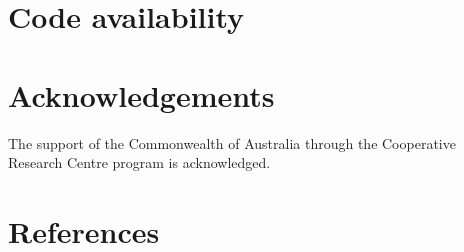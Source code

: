 \documentclass[final,3p,times,authoryear]{elsarticle}
\begin{document}
\printglossary[title={List of Symbols}]

\section{Code availability}\label{sec:available}



\section*{Acknowledgements}
The support of the Commonwealth of Australia through the Cooperative Research Centre program is acknowledged.

\section*{References}\label{sec:ref}
   
  


\begin{thebibliography}{00}


\bibitem[ ()]{}

\end{thebibliography}


\appendix
\setcounter{table}{0}
\renewcommand{\thetable}{A\arabic{table}}



\end{document}
